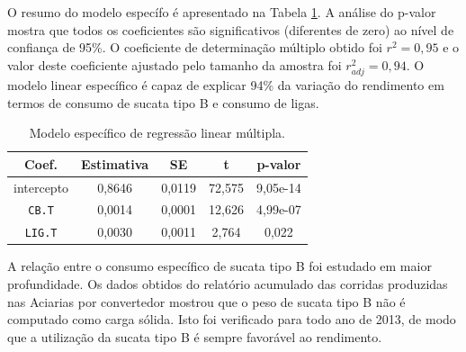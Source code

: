 \begin{multicols}{2}
	O resumo do modelo específo é apresentado na Tabela \ref{tab:mod_esp}. A análise do p-valor mostra que todos os coeficientes são significativos (diferentes de zero) ao nível de confiança de 95\%. O coeficiente de determinação múltiplo obtido foi $r^2=0,95$ e o valor deste coeficiente ajustado pelo tamanho da amostra foi $r_{adj}^2=0,94$. O modelo linear específico é capaz de explicar 94\% da variação do rendimento em termos de consumo de sucata tipo B e consumo de ligas.
	\begin{table}[H]
	\begin{center}
	\begin{small}
		\caption{Modelo específico de regressão linear múltipla.}
		\label{tab:mod_esp}
			\begin{tabular}{ccccc}
				\hline
				Coef. & Estimativa & SE & t & p-valor \\
				\hline \hline
				intercepto		&  0,8646  & 0,0119 &  72,575 & 9,05e-14 \\
				\texttt{CB.T}	&  0,0014  & 0,0001 &  12,626 & 4,99e-07 \\
				\texttt{LIG.T}	&  0,0030  & 0,0011 &   2,764 &    0,022 \\
				\hline
			\end{tabular}
			\end{small}
			\end{center}
	\end{table}						
	A relação entre o consumo específico de sucata tipo B foi estudado em maior profundidade. Os dados obtidos do relatório acumulado das corridas produzidas nas Aciarias por convertedor\cite{rel4} mostrou que o peso de sucata tipo B não é computado como carga sólida. Isto foi verificado para todo ano de 2013, de modo que a utilização da sucata tipo B é sempre favorável ao rendimento.
	

\end{multicols}
